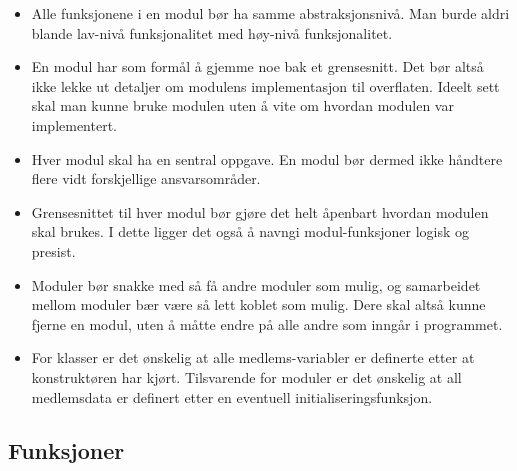 \begin{itemize}
    \item Alle funksjonene i en modul bør ha samme abstraksjonsnivå. Man burde aldri blande lav-nivå funksjonalitet med høy-nivå funksjonalitet.
    \item En modul har som formål å gjemme noe bak et grensesnitt. Det bør altså ikke lekke ut detaljer om modulens implementasjon til overflaten. Ideelt sett skal man kunne bruke modulen uten å vite om hvordan modulen var implementert.
    
    \item Hver modul skal ha en sentral oppgave. En modul bør dermed ikke håndtere flere vidt forskjellige ansvarsområder.
    
    \item Grensesnittet til hver modul bør gjøre det helt åpenbart hvordan modulen skal brukes. I dette ligger det også å navngi modul-funksjoner logisk og presist.
    
    \item Moduler bør snakke med så få andre moduler som mulig, og samarbeidet mellom moduler bær være så lett koblet som mulig. Dere skal altså kunne fjerne en modul, uten å måtte endre på alle andre som inngår i programmet. 
    
    \item For klasser er det ønskelig at alle medlems-variabler er definerte etter at konstruktøren har kjørt. Tilsvarende for moduler er det ønskelig at all medlemsdata er definert etter en eventuell initialiseringsfunksjon.
\end{itemize}



\subsection{Funksjoner}

